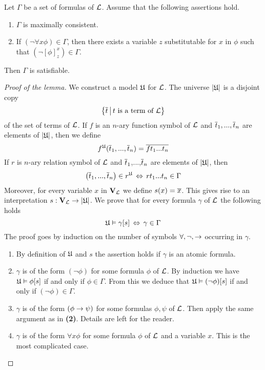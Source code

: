 \documentclass[10pt]{amsart}
\begin{document}
\begin{lemma}\label{lemma:model_existence_lemma}
	Let $\Gamma$ be a set of formulas of ${\mathcal L}$. Assume that the following assertions hold.
	\begin{enumerate}[label=\emph{\textbf{(\arabic*)}}, leftmargin=3.0em]
		\item $\Gamma$ is maximally consistent.
		\item If $(\neg\forall x\phi) \in \Gamma$, then there exists a variable $z$ substitutable for $x$ in $\phi$ such that $(\neg[\phi]^x_z) \in \Gamma$.
	\end{enumerate}
	Then $\Gamma$ is satisfiable.
\end{lemma}
\begin{proof}[Proof of the lemma]
	We construct a model ${\mathfrak U}$ for ${\mathcal L}$. The universe $|{\mathfrak U}|$ is a disjoint copy
	$$\big\{\overline{t}\,\big|\,t\mbox{ is a term of }{\mathcal L}\big\}$$
	of the set of terms of ${\mathcal L}$. If $f$ is an $n$-ary function symbol of ${\mathcal L}$ and $\overline{t}_1,...,\overline{t}_n$ are elements of $|{\mathfrak U}|$, then we define
	$$f^{{\mathfrak U}}(\overline{t}_1,...,\overline{t}_n) = \overline{ft_1...t_n}$$
	If $r$ is $n$-ary relation symbol of ${\mathcal L}$ and $\overline{t}_1$,...,$\overline{t}_n$ are elements of $|{\mathfrak U}|$, then
	$$\left(\overline{t}_1,...,\overline{t}_n\right)\in r^{{\mathfrak U}}\,\Leftrightarrow\,rt_1...t_n \in \Gamma$$
	Moreover, for every variable $x$ in $\mathbf{V}_{{\mathcal L}}$ we define $s(x) = \overline{x}$. This gives rise to an interpretation $s:\mathbf{V}_{{\mathcal L}}\rightarrow |{\mathfrak U}|$. We prove that for every formula $\gamma$ of ${\mathcal L}$ the following holds
	$${\mathfrak U} \vDash \gamma[s] \,\Leftrightarrow\, \gamma \in \Gamma$$
	The proof goes by induction on the number of symbols $\forall , \neg, \rightarrow$ occurring in $\gamma$.
	\begin{enumerate}[label=\textbf{(\arabic*)}, leftmargin=3.0em]
		\item By definition of ${\mathfrak U}$ and $s$ the assertion holds if $\gamma$ is an atomic formula.
		\item $\gamma$ is of the form $(\neg\phi)$ for some formula $\phi$ of ${\mathcal L}$. By induction we have ${\mathfrak U} \vDash \phi[s]$ if and only if $\phi \in \Gamma$. From this we deduce that ${\mathfrak U} \vDash (\neg\phi)[s]$ if and only if $(\neg\phi) \in \Gamma$.
		\item $\gamma$ is of the form $(\phi \rightarrow \psi)$ for some formulas $\phi, \psi$ of ${\mathcal L}$. Then apply the same argument as in \textbf{(2)}. Details are left for the reader.
		\item $\gamma$ is of the form $\forall x\phi$ for some formula $\phi$ of ${\mathcal L}$ and a variable $x$. This is the most complicated
		      case.

\end{enumerate}
\end{proof}
\end{document}
